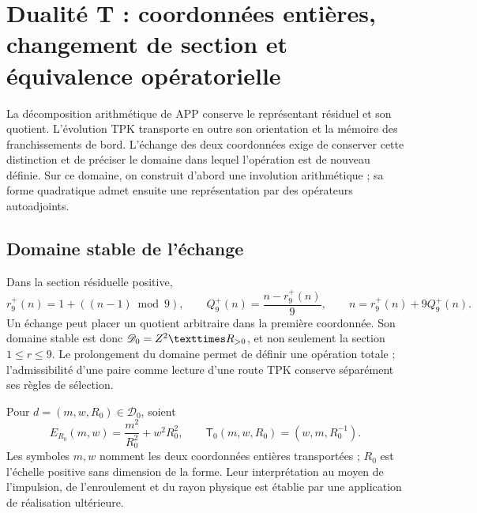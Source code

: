 \section{Dualité T : coordonnées entières, changement de section et équivalence opératorielle}
\label{x_reciprocidad:iv:dualidad}

La décomposition arithmétique de APP conserve le représentant résiduel
et son quotient. L’évolution TPK transporte en outre son orientation et
la mémoire des franchissements de bord. L’échange des deux
coordonnées exige de conserver cette distinction et de préciser le domaine
dans lequel l’opération est de nouveau définie. Sur ce domaine, on
construit d’abord une involution arithmétique ; sa forme quadratique
admet ensuite une représentation par des opérateurs autoadjoints.

\subsection{Domaine stable de l’échange}

Dans la section résiduelle positive,
\begin{equation}
 r_9^+(n)=1+((n-1)\bmod9),\qquad
 Q_9^+(n)=\frac{n-r_9^+(n)}9,
 \qquad n=r_9^+(n)+9Q_9^+(n).
 \label{x_reciprocidad:iv:eq:division-positiva}
\end{equation}
Un échange peut placer un quotient arbitraire dans la première
coordonnée. Son domaine stable est donc
\(\mathscr D_0=\ZZ^2\times\RR_{>0}\), et non seulement la section
\(1\leq r\leq9\). Le prolongement du domaine permet de définir
une opération totale ; l’admissibilité d’une paire comme lecture d’une
route TPK conserve séparément ses règles de sélection.

\begin{definition}
\label{x_reciprocidad:iv:def:dualidad}
Pour \(d=(m,w,R_0)\in\mathscr D_0\), soient
\begin{equation}
 E_{R_0}(m,w)=\frac{m^2}{R_0^2}+w^2R_0^2,
 \qquad
 \mathsf T_0(m,w,R_0)=(w,m,R_0^{-1}).
 \label{x_reciprocidad:iv:eq:energia-t}
\end{equation}
Les symboles \(m,w\) nomment les deux coordonnées entières
transportées ; \(R_0\) est l’échelle positive sans dimension de
la forme. Leur interprétation au moyen de l’impulsion, de l’enroulement et du
rayon physique est établie par une application de réalisation ultérieure.
\end{definition}

